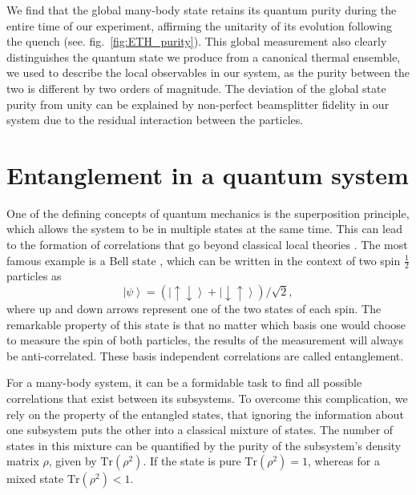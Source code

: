 We find that the global many-body state retains its quantum purity during the entire time of our experiment, affirming the unitarity of its evolution following the quench (see. fig.~\ref{fig:ETH_purity}). This global measurement also clearly distinguishes the quantum state we produce from a canonical thermal ensemble, we used to describe the local observables in our system, as the purity between the two is different by two orders of magnitude. The deviation of the global state purity from unity can be explained by non-perfect beamsplitter fidelity in our system due to the residual interaction between the particles.

\section{Entanglement in a quantum system}
One of the defining concepts of quantum mechanics is the superposition principle, which allows the system to be in multiple states at the same time. This can lead to the formation of correlations that go beyond classical local theories \cite{Horodecki2009}. The most famous example is a Bell state \cite{Bell1964}, which can be written in the context of two spin $\frac{1}{2}$ particles as 
\begin{equation}
\left| \psi \right>=(\left| \uparrow \downarrow \right>+ \left| \downarrow \uparrow \right>)/\sqrt{2},
\end{equation}
where up and down arrows represent one of the two states of each spin. The remarkable property of this state is that no matter which basis one would choose to measure the spin of both particles, the results of the measurement will always be anti-correlated. These basis independent correlations are called entanglement.

For a many-body system, it can be a formidable task to find all possible correlations that exist between its subsystems. To overcome this complication, we rely on the property of the entangled states, that ignoring the information about one subsystem puts the other into a classical mixture of states. The number of states in this mixture can be quantified by the purity of the subsystem's density matrix $\rho$, given by $\textrm{Tr}(\rho^2)$. If the state is pure $\textrm{Tr}(\rho^2)=1$, whereas for a mixed state $\textrm{Tr}(\rho^2)<1$.

